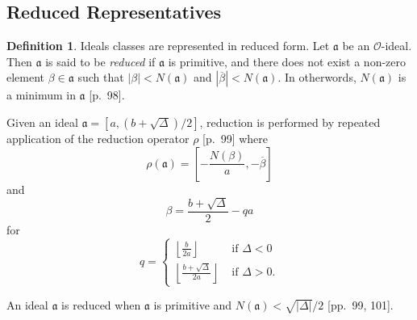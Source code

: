 \documentclass{ucalgthes1}
\theoremstyle{plain}
\theoremstyle{definition}
\newtheorem{defn}[thm]{Definition}
\newcommand{\OO}{\mathcal{O}}
\newcommand{\floor}[1]{\left\lfloor #1 \right\rfloor}
\begin{document}
\subsection{Reduced Representatives}
\label{subsec:reduction}
\begin{defn}
Ideals classes are represented in reduced form. Let $\mathfrak{a}$ be an $\OO$-ideal. Then $\mathfrak{a}$ is said to be \emph{reduced} if $\mathfrak{a}$ is primitive, and there does not exist a non-zero element $\beta \in \mathfrak{a}$ such that $|\beta| < N(\mathfrak{a})$ and $|\overline{\beta}| < N(\mathfrak{a})$.  In otherwords, $N(\mathfrak{a})$ is a minimum in $\mathfrak{a}$ \cite{Jac09}[p.~98].
\end{defn}

Given an ideal $\mathfrak a = [a, (b+\sqrt\Delta)/2]$, reduction is performed by repeated application of the reduction operator $\rho$ \cite{Jac09}[p.~99] where
\[
	\rho(\mathfrak a) = \left[-\frac{N(\beta)}{a}, -\overline{\beta}\right]
\]
and
\[
	\beta = \frac{b +\sqrt\Delta}{2} -qa
\]
for
\[
	q = \begin{cases}
		\floor{\frac{b}{2a}} & \mbox{ if } \Delta < 0 \\
		\floor{\frac{b+\sqrt\Delta}{2a}} & \mbox{ if } \Delta > 0.
	\end{cases}
\]

\noindent
An ideal $\mathfrak a$ is reduced when $\mathfrak a$ is primitive and $N(\mathfrak a) < \sqrt{|\Delta|}/2$ \cite{Jac09}[pp.~99, 101].
\end{document}
